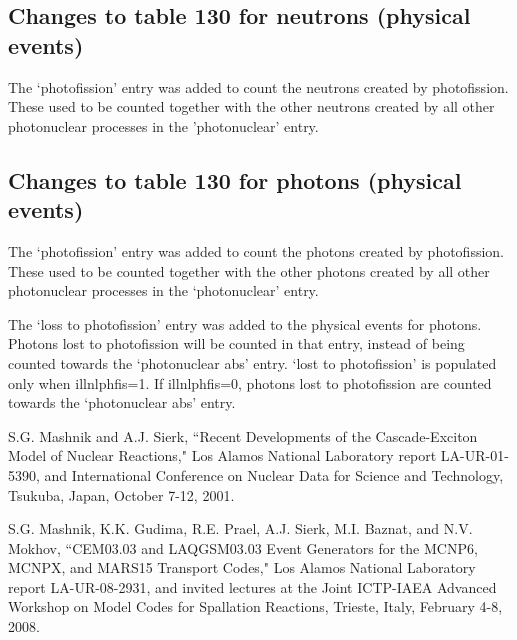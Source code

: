 \documentclass[fleqn,11pt]{article}
\begin{document}
\subsection{Changes to table 130 for neutrons (physical events)}
The `photofission' entry was added to count the neutrons 
created by photofission. These used to be counted 
together with the other neutrons created by all other 
photonuclear processes in the 'photonuclear' entry.

\subsection{Changes to table 130 for photons (physical events)}
The `photofission' entry was added to count the photons 
created by photofission. These used to be counted 
together with the other photons created by all other
photonuclear processes in the `photonuclear' entry.

The `loss to photofission' entry was added to the
physical events for photons. Photons lost to
photofission will be counted in that entry, instead
of being counted towards the `photonuclear abs' entry.
`lost to photofission' is populated only when
illnlphfis=1. If illnlphfis=0, photons lost to 
photofission are counted towards the `photonuclear 
abs' entry.


\begin{thebibliography}{99}

%
%

 S.G. Mashnik and A.J. Sierk, ``Recent Developments
of the Cascade-Exciton Model of Nuclear Reactions," Los Alamos National 
Laboratory report LA-UR-01-5390, and International Conference on Nuclear 
Data for Science and Technology, Tsukuba, Japan, October 7-12, 2001.

 S.G. Mashnik, K.K. Gudima, R.E. Prael, A.J. Sierk, 
M.I. Baznat, and N.V. Mokhov, ``CEM03.03 and LAQGSM03.03 Event Generators
for the MCNP6, MCNPX, and MARS15 Transport Codes," Los Alamos National
Laboratory report LA-UR-08-2931, and invited lectures at the Joint
ICTP-IAEA Advanced Workshop on Model Codes for Spallation Reactions,
Trieste, Italy, February 4-8, 2008.

\end{thebibliography}
\end{document}
